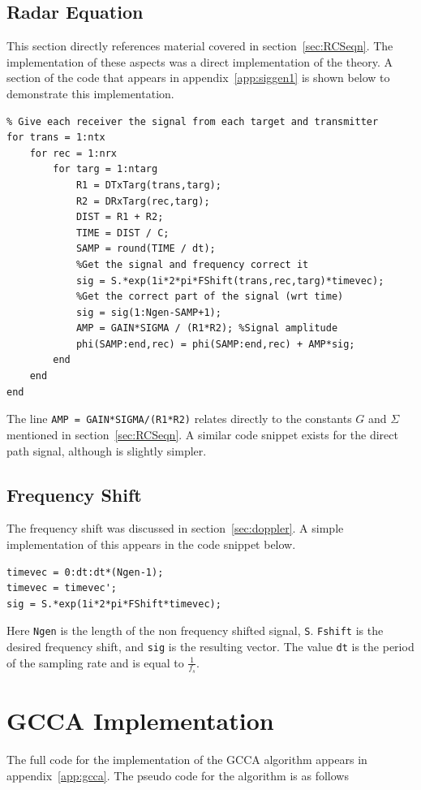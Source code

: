 \documentclass[12pt,openany,a4paper]{book}
\begin{document}
\subsection{Radar Equation}
\label{RE}
This section directly references material covered in section~\ref{sec:RCSeqn}. The implementation of these aspects was a direct implementation of the theory. A section of the code that appears in appendix~\ref{app:siggen1} is shown below to demonstrate this implementation.


\begin{verbatim}
% Give each receiver the signal from each target and transmitter
for trans = 1:ntx
    for rec = 1:nrx
        for targ = 1:ntarg
            R1 = DTxTarg(trans,targ);
            R2 = DRxTarg(rec,targ);
            DIST = R1 + R2;
            TIME = DIST / C;
            SAMP = round(TIME / dt);
            %Get the signal and frequency correct it
            sig = S.*exp(1i*2*pi*FShift(trans,rec,targ)*timevec);
            %Get the correct part of the signal (wrt time)
            sig = sig(1:Ngen-SAMP+1); 
            AMP = GAIN*SIGMA / (R1*R2); %Signal amplitude
            phi(SAMP:end,rec) = phi(SAMP:end,rec) + AMP*sig;
        end
    end
end
\end{verbatim}

The line \verb+AMP = GAIN*SIGMA/(R1*R2)+ relates directly to the constants $G$ and $\Sigma$ mentioned in section~\ref{sec:RCSeqn}. A similar code snippet exists for the direct path signal, although is slightly simpler.

\subsection{Frequency Shift}
\label{FS}
The frequency shift was discussed in section~\ref{sec:doppler}. A simple implementation of this appears in the code snippet below.

\begin{verbatim}
timevec = 0:dt:dt*(Ngen-1);
timevec = timevec';
sig = S.*exp(1i*2*pi*FShift*timevec);
\end{verbatim}

Here \verb+Ngen+ is the length of the non frequency shifted signal, \verb+S+. \verb+Fshift+ is the desired frequency shift, and \verb+sig+ is the resulting vector. The value \verb+dt+ is the period of the sampling rate and is equal to $\frac{1}{f_s}$.

\section{GCCA Implementation}
\label{gccaI}
The full code for the implementation of the GCCA algorithm appears in appendix~\ref{app:gcca}. The pseudo code for the algorithm is as follows
\end{document}
